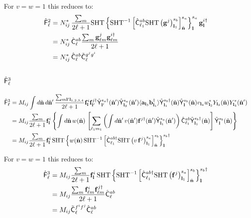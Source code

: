 \documentclass[a4paper,10pt]{article}
\newcommand{\nv}{\hat{\bf n}}
\begin{document}
    For $v=w=1$ this reduces to:
    \begin{align}\nonumber
     \hat{\sf F}^2_\ell
     &=N^*_{ij}\,\frac{\sum_m}{2\ell+1}{\rm SHT}\left\{{\rm SHT}^{-1}\left[\hat{\sf C}^{ab}_{\ell_1}{\rm SHT}\left({\bf g}^j\right)^{s_b}_{{\bf l}_1}\right]^{s_a}_{\nv}\right\}^{s_a}_{\bf l}{\bf g}^{i\dag}_{\bf l}\\\nonumber
     &=N^*_{ij}\,\hat{\sf C}^{ab}_{\ell}\frac{\sum_m{\bf g}^j_{\ell m}{\bf g}^{i\dag}_{\ell m}}{2\ell+1}\\\nonumber
     &=N^*_{ij}\,\hat{\sf C}^{ab}_{\ell}\tilde{\sf C}^{g^jg^i}_\ell
    \end{align}
    
  \subsection{$\hat{\sf F}^3_\ell$}
    \begin{align}\nonumber
     \hat{\sf F}^3_\ell
     &=M_{ij}\int d\nv\,d\nv'\,\frac{\sum_{m{\bf l}'{\bf l}_{1,2,3,4}}}{2\ell+1}{\bf f}^i_{\bf l}{\bf f}^{j\dag}_{{\bf l}'}\hat{\sf Y}^{s_a\dag}_{\bf l'}(\nv')\hat{\sf Y}^{s_a}_{{\bf l}_3}(\nv')\langle{\bf a}_{{\bf l}_3}{\bf b}^\dag_{{\bf l}_1}\rangle\hat{\sf Y}^{s_b\dag}_{{\bf l}_1}(\nv)\hat{\sf Y}^{s_b}_{{\bf l}}(\nv)v_{{\bf l}_4}w^*_{{\bf l}_2}Y_{{\bf l}_2}(\nv)Y^*_{{\bf l}_4}(\nv')\\\nonumber
     &=M_{ij}\frac{\sum_{m}}{2\ell+1}{\bf f}^i_{\bf l}\left\{\int d\nv\,w(\nv)\,\left[\sum_{\ell_1m_1}\left(\int d\nv'\,v(\nv'){\bf f}^{j\dag}(\nv')\hat{\sf Y}^{s_a}_{{\bf l}_1}(\nv')\right)\hat{\sf C}^{ab}_{\ell_1}\hat{\sf Y}^{s_b\dag}_{{\bf l}_1}(\nv)\right]\hat{\sf Y}^{s_b}_{{\bf l}}(\nv)\right\}\\\label{eq:bias_3}
     &=M_{ij}\frac{\sum_{m}}{2\ell+1}{\bf f}^i_{\bf l}\,{\rm SHT}\left\{w(\nv)\,{\rm SHT}^{-1}\left[\hat{\sf C}^{ab\dag}_{\ell_1}{\rm SHT}\left(v\,{\bf f}^j\right)^{s_a}_{{\bf l}_1}\right]^{s_b}_{\nv}\right\}^{s_b\dag}_{\bf l}
    \end{align}

    For $v=w=1$ this reduces to:
    \begin{align}\nonumber
     \hat{\sf F}^3_\ell
     &=M_{ij}\frac{\sum_{m}}{2\ell+1}{\bf f}^i_{\bf l}\,{\rm SHT}\left\{{\rm SHT}^{-1}\left[\hat{\sf C}^{ab\dag}_{\ell_1}{\rm SHT}\left({\bf f}^j\right)^{s_a}_{{\bf l}_1}\right]^{s_b}_{\nv}\right\}^{s_b\dag}_{\bf l}\\\nonumber
     &=M_{ij}\frac{\sum_{m}{\bf f}^i_{\ell m}{\bf f}^{j\dag}_{\ell m}}{2\ell+1}\hat{\sf C}^{ab}_{\ell}\\\nonumber
     &=M_{ij}\tilde{\sf C}^{f^if^j}_\ell\hat{\sf C}^{ab}_{\ell}
    \end{align}
    
\end{document}
